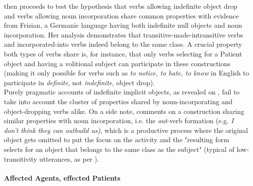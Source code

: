 \textcite[461-463]{Marti2015} then proceeds to test the hypothesis that verbs allowing indefinite object drop and verbs allowing noun incorporation share common properties with evidence from Frisian, a Germanic language having both indefinite null objects and noun incorporation. Her analysis demonstrates that transitive-made-intransitive verbs and incorporated-into verbs indeed belong to the same class. A crucial property both types of verbs share is, for instance, that only verbs selecting for a Patient object and having a volitional subject can participate in these constructions (making it only possible for verbs such as \textit{to notice, to hate, to know} in English to participate in \textit{definite}, not \textit{indefinite}, object drop).\\
Purely pragmatic accounts of indefinite implicit objects, as revealed on , fail to take into account the cluster of properties shared by noun-incorporating and object-dropping verbs alike. On a side note, \textcite[249]{Mittwoch2005} comments on a construction sharing similar properties with noun incorporation, i.e. the \textit{out}-verb formation (e.g. \textit{I don't think they can outbuild us)}, which is a productive process where the original object gets omitted to put the focus on the activity and the "resulting form selects for an object that belongs to the same class as the subject" (typical of low-transitivity utterances, as per \textcite{HopperThompson1980}).


\paragraph{Affected Agents, effected Patients} 

